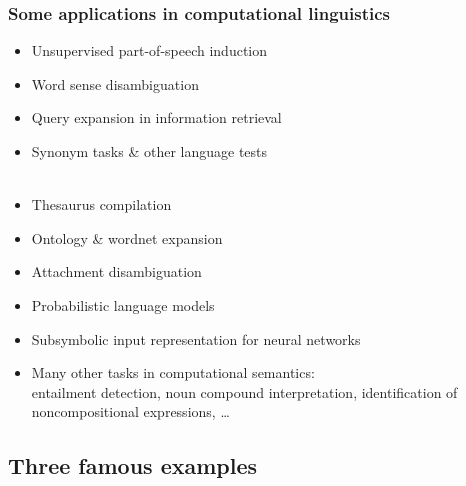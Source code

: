 \documentclass[t]{beamer} %
\begin{document}
\begin{frame}
  \frametitle{Some applications in computational linguistics}

  \ungap
  \begin{itemize}
  \item Unsupervised part-of-speech induction \citep{Schuetze:95}
  \item Word sense disambiguation \citep{Schuetze:98}
  \item Query expansion in information retrieval \citep{Grefenstette:94}
  \item Synonym tasks \& other language tests\\\ \citep{Landauer:Dumais:97,Turney:etc:03}
  \item Thesaurus compilation \citep{Lin:98b,Rapp:04a}
  \item Ontology \& wordnet expansion \citep{Pantel:etc:09}
  \item Attachment disambiguation \citep*{Pantel:Lin:00}
  \item Probabilistic language models \citep{Bengio:etc:03b}
  \item Subsymbolic input representation for neural networks
  \item Many other tasks in computational semantics:\\
    entailment detection, noun compound interpretation, identification
    of noncompositional expressions, \ldots
  \end{itemize}
\end{frame}

\subsection{Three famous examples}
\end{document}
